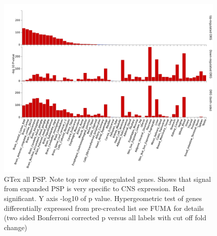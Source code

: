 \begin{figure}
    \centering
    \includegraphics[width=\textwidth]{images/FUMA_plots/gtex_v8_ts_FUMA_PSP_gtex.png}
    \caption[GTEx All PSP]{GTex all PSP. Note top row of upregulated genes. Shows that signal from expanded PSP is very specific to CNS expression. Red significant. Y axis -log10 of p value. Hypergeometric test of genes differentially expressed from pre-created list see FUMA \cite{watanabe2017functional} for details (two sided Bonferroni corrected p versus all labels with cut off fold change) }
    \label{fig:gtex all PSP}
\end{figure}
\clearpage



